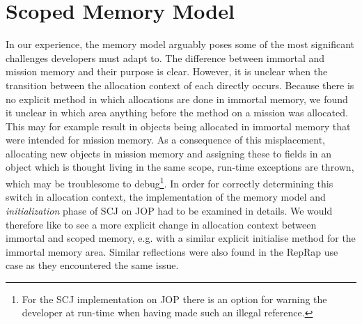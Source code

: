 \section{Scoped Memory Model} %
 \label{sec:scoped_memory_model}
In our experience, the memory model arguably poses some of the most significant challenges developers must adapt to. The difference between immortal and mission memory and their purpose is clear. However, it is unclear when the transition between the allocation context of each directly occurs. Because there is no explicit method in which allocations are done in immortal memory, we found it unclear in which area anything before the  method on a mission was allocated. This may for example result in objects being allocated in immortal memory that were intended for mission memory. As a consequence of this misplacement, allocating new objects in mission memory and assigning these to fields in an object which is thought living in the same scope, run-time exceptions are thrown, which may be troublesome to debug\footnote{For the SCJ implementation on JOP there is an option for warning the developer at run-time when having made such an illegal reference.}. In order for correctly determining this switch in allocation context, the implementation of the memory model and \textit{initialization} phase of SCJ on JOP had to be examined in details. We would therefore like to see a more explicit change in allocation context between immortal and scoped memory, e.g. with a similar explicit initialise method for the immortal memory area. Similar reflections were also found in the RepRap use case\cite{Schoeberl:2012:RepRap} as they encountered the same issue.

